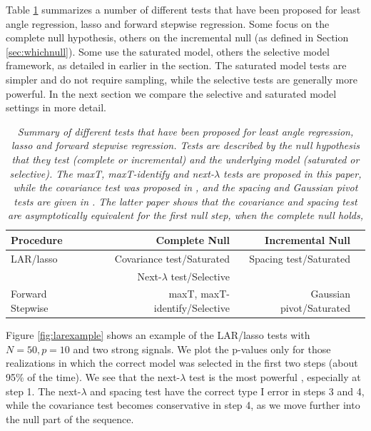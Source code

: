 \documentclass{article}
\begin{document}
Table \ref{tab:testsummary} summarizes a number of different tests that have been proposed for least angle regression, lasso and forward stepwise regression.
Some focus on the complete null hypothesis, others on the incremental null (as defined in Section \ref{sec:whichnull}).
Some use the saturated model, others the selective model framework, as detailed in earlier in the section.
The saturated model tests are simpler and do not require sampling, while the selective tests are generally more powerful. In the next section we compare the  selective and saturated model settings in more detail.

\begin{table}
\begin{center}
\begin{tabular}{ | l | r|r| r}
        \hline
Procedure& Complete Null & Incremental Null\\
\hline
LAR/lasso& Covariance test/Saturated&Spacing test/Saturated \\
        & Next-$\lambda$ test/Selective& \\
        \hline
Forward Stepwise &maxT, maxT-identify/Selective &Gaussian pivot/Saturated\\
\hline
\end{tabular}
\end{center}
\caption{\em Summary of different tests that have been proposed for least angle regression, lasso and forward stepwise regression.
Tests are described by the null hypothesis that they test (complete or incremental)  and the underlying model (saturated or selective).
The maxT, maxT-identify and next-$\lambda$ tests are proposed in this paper, while the covariance test was proposed in \citet{lockhart2014significance}, and the spacing and Gaussian
pivot tests are given in \citet{spacings}. The latter paper shows that the covariance and spacing test are asymptotically equivalent for the first null step, when the complete null holds,}
\label{tab:testsummary}
\end{table}
Figure  \ref{fig:larexample} shows an example of the LAR/lasso tests with $N=50, p=10$ and two strong signals.
We plot the p-values only for those realizations in which the correct model was selected in the first two steps (about 95\% of the time).
We see that the next-$\lambda$ test is the most powerful , especially at step 1. The next-$\lambda$ and spacing test have the correct type I error in steps 3 and 4,
while the covariance test becomes conservative in step 4, as we move further into the null part of the sequence.
\end{document}
